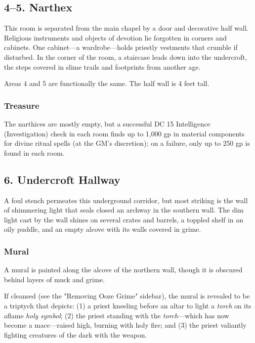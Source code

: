 \documentclass[10pt,a4paper,twoside,bg=print,twocolumn,openany,nodeprecatedcode]{dndbook}
\begin{document}
\subsection{4–5. Narthex}
\begin{DndReadAloud}{}
This room is separated from the main chapel by a door and decorative half wall. Religious instruments and objects of devotion lie forgotten in corners and cabinets. One cabinet—a wardrobe—holds priestly vestments that crumble if disturbed. In the corner of the room, a staircase leads down into the undercroft, the steps covered in slime trails and footprints from another age.

\end{DndReadAloud}

Areas 4 and 5 are functionally the same. The half wall is 4 feet tall.

\subsubsection{Treasure}
The narthices are mostly empty, but a successful DC 15 Intelligence (Investigation) check in each room finds up to 1,000 gp in material components for divine ritual spells (at the GM's discretion); on a failure, only up to 250 gp is found in each room.

\subsection{6. Undercroft Hallway}
\begin{DndReadAloud}{}
A foul stench permeates this underground corridor, but most striking is the wall of shimmering light that seals closed an archway in the southern wall. The dim light cast by the wall shines on several crates and barrels, a toppled shelf in an oily puddle, and an empty alcove with its walls covered in grime.

\end{DndReadAloud}

\subsubsection{Mural}
A mural is painted along the alcove of the northern wall, though it is obscured behind layers of muck and grime.

If cleansed (see the "Removing Ooze Grime" sidebar), the mural is revealed to be a triptych that depicts: (1) a priest kneeling before an altar to light a \textit{torch} on its aflame \textit{holy symbol}; (2) the priest standing with the \textit{torch}—which has now become a mace—raised high, burning with holy fire; and (3) the priest valiantly fighting creatures of the dark with the weapon.
\end{document}
